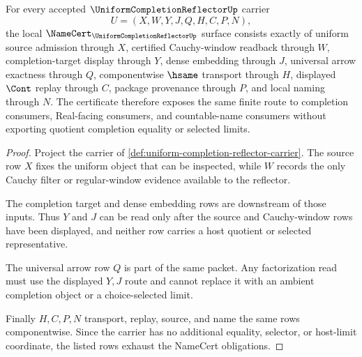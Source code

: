 \begin{theorem}
\label{thm:uniform-completion-reflector-namecert-obligations}
For every accepted $\UniformCompletionReflectorUp$ carrier
$$
U=(X,W,Y,J,Q,H,C,P,N),
$$
the local $\NameCert_{\UniformCompletionReflectorUp}$ surface consists exactly of uniform source admission through $X$, certified Cauchy-window readback through $W$, completion-target display through $Y$, dense embedding through $J$, universal arrow exactness through $Q$, componentwise $\hsame$ transport through $H$, displayed $\Cont$ replay through $C$, package provenance through $P$, and local naming through $N$. The certificate therefore exposes the same finite route to completion consumers, Real-facing consumers, and countable-name consumers without exporting quotient completion equality or selected limits.
\end{theorem}
\begin{proof}
Project the carrier of \autoref{def:uniform-completion-reflector-carrier}. The source row $X$ fixes the uniform object that can be inspected, while $W$ records the only Cauchy filter or regular-window evidence available to the reflector.

The completion target and dense embedding rows are downstream of those inputs. Thus $Y$ and $J$ can be read only after the source and Cauchy-window rows have been displayed, and neither row carries a host quotient or selected representative.

The universal arrow row $Q$ is part of the same packet. Any factorization read must use the displayed $Y,J$ route and cannot replace it with an ambient completion object or a choice-selected limit.

Finally $H,C,P,N$ transport, replay, source, and name the same rows componentwise. Since the carrier has no additional equality, selector, or host-limit coordinate, the listed rows exhaust the NameCert obligations.
\end{proof}

